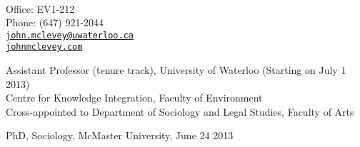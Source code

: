 \documentclass[11pt,usenames,dvipsnames]{article}
\makeatletter
\def\myemail{john.mclevey@uwaterloo.ca}
\def\myphone{(647) 921-2044}
\def\lastupdated{Last Updated: June 25, 2013}
\makeatother
\begin{document}
\begin{minipage}[t]{2.95in}
 \\
  \end{minipage}
\hfill     
\hfill
\begin{minipage}[t]{1.7in}
  \flushright \footnotesize Office: EV1-212 \\ Phone: \myphone \\ 
  {\scriptsize  \texttt{\href{mailto:\myemail}{\myemail}}} \\
  {\scriptsize  \texttt{\href{http://www.johnmclevey.com}{johnmclevey.com}}}\\
\end{minipage}


\bigskip

\reversemarginpar

\medskip 


\noindent Assistant Professor (tenure track), University of Waterloo (Starting on July 1 2013) \\
\noindent Centre for Knowledge Integration, Faculty of Environment \\
\noindent Cross-appointed to Department of Sociology and Legal Studies, Faculty of Arts \\

\medskip 
{}

\noindent PhD, Sociology, McMaster University, June 24 2013

\end{document}
